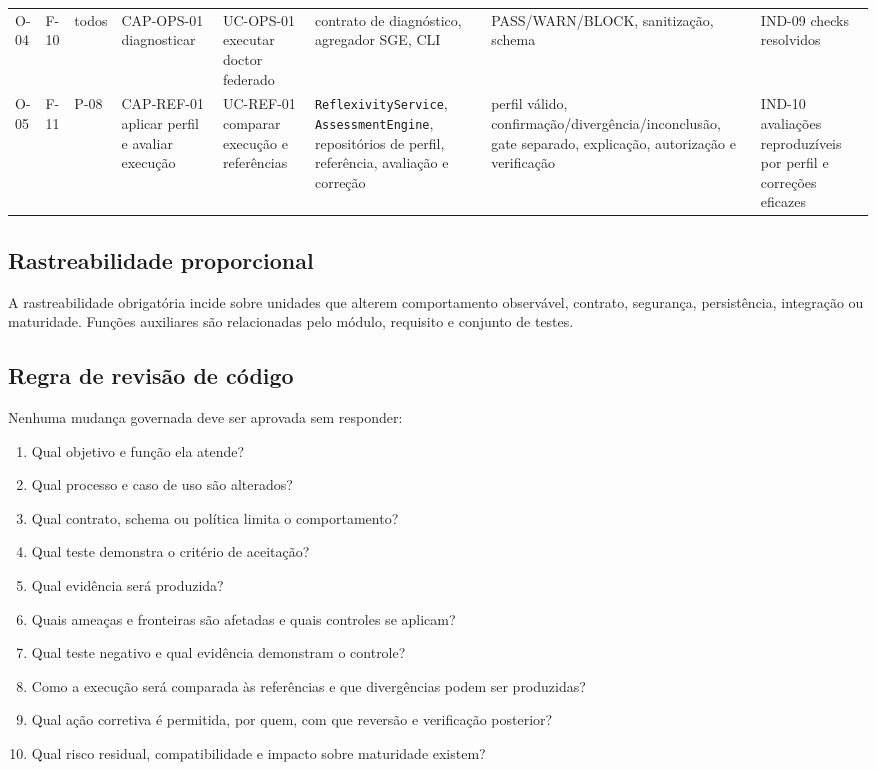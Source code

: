 \documentclass[11pt,a4paper,oneside]{article}
\begin{document}
\begin{landscape}
\begin{longtable}{P{1.3cm}P{1.3cm}P{1.3cm}P{3.4cm}P{3.5cm}P{3.8cm}P{3.6cm}P{3.0cm}}
O-04 & F-10 & todos & CAP-OPS-01 diagnosticar & UC-OPS-01 executar doctor federado & contrato de diagnóstico, agregador SGE, CLI & PASS/WARN/BLOCK, sanitização, schema & IND-09 checks resolvidos \\
O-05 & F-11 & P-08 & CAP-REF-01 aplicar perfil e avaliar execução & UC-REF-01 comparar execução e referências & \texttt{ReflexivityService}, \texttt{AssessmentEngine}, repositórios de perfil, referência, avaliação e correção & perfil válido, confirmação/divergência/inconclusão, gate separado, explicação, autorização e verificação & IND-10 avaliações reproduzíveis por perfil e correções eficazes \\
\bottomrule
\end{longtable}
\end{landscape}

\subsection{Rastreabilidade proporcional}
A rastreabilidade obrigatória incide sobre unidades que alterem comportamento observável, contrato, segurança, persistência, integração ou maturidade. Funções auxiliares são relacionadas pelo módulo, requisito e conjunto de testes.

\subsection{Regra de revisão de código}
Nenhuma mudança governada deve ser aprovada sem responder:
\begin{enumerate}
  \item Qual objetivo e função ela atende?
  \item Qual processo e caso de uso são alterados?
  \item Qual contrato, schema ou política limita o comportamento?
  \item Qual teste demonstra o critério de aceitação?
  \item Qual evidência será produzida?
  \item Quais ameaças e fronteiras são afetadas e quais controles se aplicam?
  \item Qual teste negativo e qual evidência demonstram o controle?
  \item Como a execução será comparada às referências e que divergências podem ser produzidas?
  \item Qual ação corretiva é permitida, por quem, com que reversão e verificação posterior?
  \item Qual risco residual, compatibilidade e impacto sobre maturidade existem?
\end{enumerate}
\end{document}

